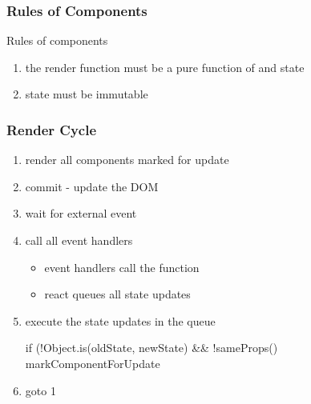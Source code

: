 \begin{frame}[fragile] \frametitle{Rules of Components}
Rules of components
\begin{enumerate}
  \item the render function must be a pure function of  and state
  \item state must be immutable
\end{enumerate}

\end{frame}

\begin{frame}[fragile] \frametitle{Render Cycle}
\begin{enumerate}
  \item render all components marked for update
  \item commit - update the DOM
  \item wait for external event
  \item call all event handlers
  \begin{itemize}
    \item event handlers call the  function
    \item react queues all state updates
  \end{itemize}
  \item execute the state updates in the queue
\begin{CodeBox}{}
if (!Object.is(oldState, newState) && !sameProps() {
  markComponentForUpdate
 }
\end{CodeBox}
 \item goto 1
\end{enumerate}
\end{frame}

